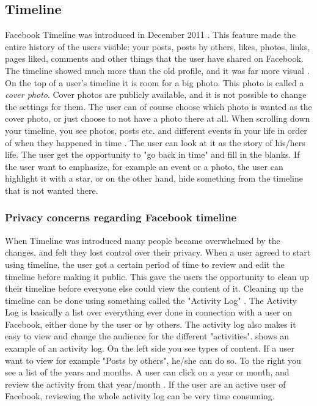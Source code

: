 \subsection{Timeline}
\label{subsec:timeline}
Facebook Timeline was introduced in December 2011 \cite{EvolutionOfFacebook}. This feature made the entire history of the users visible: your posts, posts by others, likes, photos, links, pages liked, comments and other things that the user have shared on Facebook. The timeline showed much more than the old profile, and it was far more visual \cite{timeline}. On the top of a user's timeline it is room for a big photo. This photo is called a \emph{cover photo}. Cover photos are publicly available, and it is not possible to change the settings for them. The user can of course choose which photo is wanted as the cover photo, or just choose to not have a photo there at all. When scrolling down your timeline, you see photos, posts etc. and different events in your life in order of when they happened in time \cite{timeline}. The user can look at it as the story of his/hers life. The user get the opportunity to "go back in time" and fill in the blanks. If the user want to emphasize, for example an event or a photo, the user can highlight it with a star, or on the other hand, hide something from the timeline that is not wanted there. 

\subsubsection{Privacy concerns regarding Facebook timeline}
When Timeline was introduced many people became overwhelmed by the changes, and felt they lost control over their privacy. When a user agreed to start using timeline, the user got a certain period of time to review and edit the timeline before making it public. This gave the users the opportunity to clean up their timeline before everyone else could view the content of it. Cleaning up the timeline can be done using something called the "Activity Log" \cite{activitylog}. The Activity Log is basically a list over everything ever done in connection with a user on Facebook, either done by the user or by others. The activity log also makes it easy to view and change the audience for the different "activities".  shows an example of an activity log. On the left side you see types of content. If a user want to view for example "Posts by others", he/she can do so. To the right you see a list of the years and months. A user can click on a year or month, and review the activity from that year/month \cite{activitylog}. If the user are an active user of Facebook, reviewing the whole activity log can be very time consuming. 

